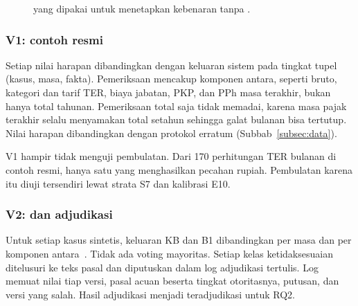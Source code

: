 \begin{figure}[t]
\centering
{}
\caption{ yang dipakai untuk menetapkan kebenaran tanpa .}
\label{fig:piramida}
\end{figure}

\subsubsection{V1: contoh resmi}
Setiap nilai harapan dibandingkan dengan keluaran sistem pada tingkat tupel (kasus, masa, fakta). Pemeriksaan mencakup komponen antara, seperti bruto, kategori dan tarif TER, biaya jabatan, PKP, dan PPh masa terakhir, bukan hanya total tahunan. Pemeriksaan total saja tidak memadai, karena masa pajak terakhir selalu menyamakan total setahun sehingga galat bulanan bisa tertutup. Nilai harapan dibandingkan dengan protokol erratum (Subbab~\ref{subsec:data}).

V1 hampir tidak menguji pembulatan. Dari 170 perhitungan TER bulanan di contoh resmi, hanya satu yang menghasilkan pecahan rupiah. Pembulatan karena itu diuji tersendiri lewat strata S7 dan kalibrasi E10.

\subsubsection{V2:  dan adjudikasi}
Untuk setiap kasus sintetis, keluaran KB dan B1 dibandingkan per masa dan per komponen antara~\cite{goldstein2024pbt}. Tidak ada voting mayoritas. Setiap kelas ketidaksesuaian ditelusuri ke teks pasal dan diputuskan dalam log adjudikasi tertulis. Log memuat nilai tiap versi, pasal acuan beserta tingkat otoritasnya, putusan, dan versi yang salah. Hasil adjudikasi menjadi  teradjudikasi untuk RQ2.

